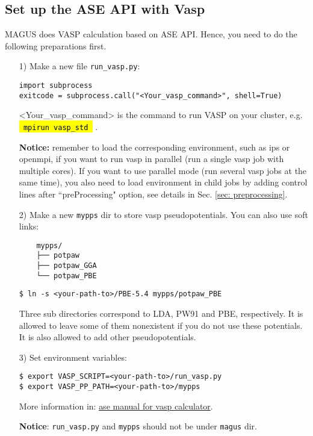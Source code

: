 \documentclass[12pt,oneside]{book}
\newcommand{\code}[1]{
  \begingroup
  \sethlcolor{Seashell}
  {\hl{\texttt{~#1~}}}
  \endgroup
}
\newcommand{\file}[1]{\texttt{#1}}
\begin{document}
\subsection{Set up the ASE API with Vasp}
MAGUS does VASP calculation based on ASE API. Hence, you need to do the following preparations first.
\begin{itemize}
\item [1)] 
    Make a new file \file{run\_vasp.py}:
    \begin{tcolorbox}
    \begin{verbatim}
import subprocess
exitcode = subprocess.call("<Your_vasp_command>", shell=True)
    \end{verbatim}
    \end{tcolorbox}
    <Your\_vasp\_command> is the command to run VASP on your cluster, e.g. \code{mpirun vasp\_std}.

    \textbf{Notice:} remember to load the corresponding environment, such as ips or openmpi, if you want to run vasp in parallel (run a single vasp job with multiple cores). If you want to use parallel mode (run several vasp jobs at the same time), you also need to load environment in child jobs by adding control lines after ``preProcessing" option, see details in Sec. \ref{sec: preprocessing}.
    
\item [2)] 
    Make a new \file{mypps} dir to store vasp pseudopotentials. You can also use soft links:
    \begin{verbatim}
    mypps/
    ├── potpaw
    ├── potpaw_GGA
    └── potpaw_PBE
    \end{verbatim}
    \begin{tcolorbox}
        \begin{verbatim}
$ ln -s <your-path-to>/PBE-5.4 mypps/potpaw_PBE
        \end{verbatim}
    \end{tcolorbox}
    Three sub directories correspond to LDA, PW91 and PBE, respectively. It is allowed to leave some of them nonexistent if you do not use these potentials. It is also allowed to add other pseudopotentials.
\item [3)] 
    Set environment variables:
    \begin{tcolorbox}
        \begin{verbatim}
$ export VASP_SCRIPT=<your-path-to>/run_vasp.py
$ export VASP_PP_PATH=<your-path-to>/mypps
        \end{verbatim}
    \end{tcolorbox}
    More information in: \textcolor{blue}{\href{https://wiki.fysik.dtu.dk/ase/ase/calculators/vasp.html\#module-ase.calculators.vasp}{ase manual for vasp calculator}}.\par
    \textbf{Notice}: \file{run\_vasp.py} and \file{mypps} should not be under \file{magus} dir.
\end{itemize}
\end{document}
